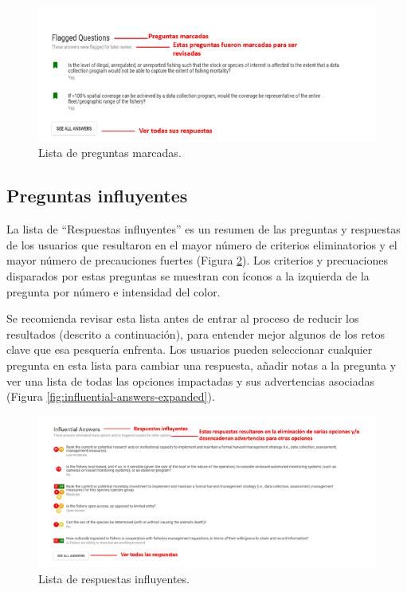 \documentclass[
  11pt,
]{book}
\begin{document}
\begin{figure}

{\centering \includegraphics[width=0.95\linewidth]{images/flagged-questions-es} 

}

\caption{Lista de preguntas marcadas.}\label{fig:flagged-questions}
\end{figure}

\hypertarget{preguntas-influyentes}{%
\subsection{Preguntas influyentes}\label{preguntas-influyentes}}

La lista de ``Respuestas influyentes'' es un resumen de las preguntas y respuestas de los usuarios que resultaron en el mayor número de criterios eliminatorios y el mayor número de precauciones fuertes (Figura \ref{fig:influential-answers}). Los criterios y precuaciones disparados por estas preguntas se muestran con íconos a la izquierda de la pregunta por número e intensidad del color.

Se recomienda revisar esta lista antes de entrar al proceso de reducir los resultados (descrito a continuación), para entender mejor algunos de los retos clave que esa pesquería enfrenta. Los usuarios pueden seleccionar cualquier pregunta en esta lista para cambiar una respuesta, añadir notas a la pregunta y ver una lista de todas las opciones impactadas y sus advertencias asociadas (Figura \ref{fig:influential-answers-expanded}).

\begin{figure}

{\centering \includegraphics[width=0.95\linewidth]{images/influential-answers-es} 

}

\caption{Lista de respuestas influyentes.}\label{fig:influential-answers}
\end{figure}
\end{document}
